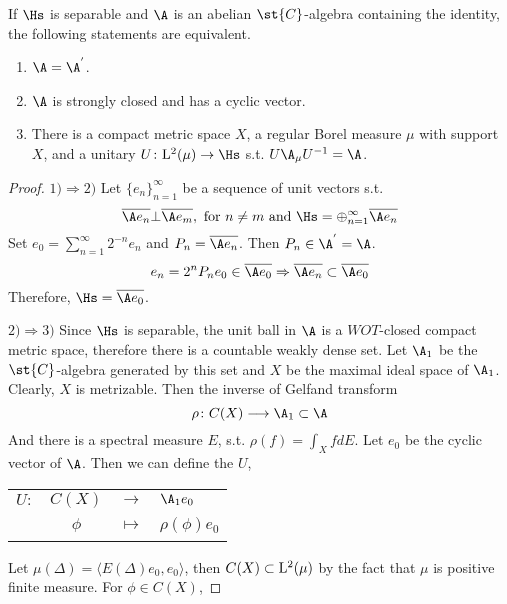 \begin{thm}
	If $\Hs$ is separable and $\A$ is an abelian $\st{C}$-algebra containing the identity, the following statements are equivalent.
	\begin{enumerate}[label=\arabic*)]
		\item $\A=\A^{'}$.
		\item $\A$ is strongly closed and has a cyclic vector.
		\item There is a compact metric space $X$, a regular Borel measure $\mu$ with support $X$, and a unitary $U \colon \lfs{2}(\mu) \sto \Hs$ s.t. $U\A_{\mu}U^{-1}=\A$.
	\end{enumerate}
\end{thm}
\begin{proof}
	$1) \Rightarrow 2)$ Let $\{e_n\}_{n=1}^{\infty}$ be a sequence of unit vectors s.t. 
	\begin{equation*}
		\clo{\A e_n} \bot \clo{\A e_m},\text{ for } n \neq m \text{ and } \Hs = \oplus_{n=1}^{\infty} \clo{\A e_n}
	\end{equation*}
	Set $e_0 = \sum_{n=1}^{\infty} 2^{-n} e_n$ and $P_n = \clo{\A e_n}$. Then $P_n \in \A^{'} = \A$. 
	\begin{equation*}
		e_n = 2^{n} P_n e_0 \in \clo{\A e_0} \Rightarrow \clo{\A e_n} \subset \clo{\A e_0}
	\end{equation*}
	Therefore, $\Hs = \clo{\A e_0}$.
	\item $2) \Rightarrow 3)$ Since $\Hs$ is separable, the unit ball in $\A$ is a $WOT$-closed  compact metric space, therefore there is a countable weakly dense set. Let $\A_1$ be the $\st{C}$-algebra generated by this set and $X$ be the maximal ideal space of $\A_1$. Clearly, $X$ is metrizable. Then the inverse of Gelfand transform
	\begin{equation*}
		\rho \colon C(X) \longrightarrow \A_1 \subset \A
	\end{equation*}
	And there is a spectral measure $E$, s.t. $\rho(f) = \int_{X} f dE$.
	Let $e_0$ be the cyclic vector of $\A$. Then we can define the $U$,
	\begin{center}
		\begin{tabular}{l c c l}
			$U \colon$ & $C(X)$ & $\longrightarrow$ & $\A_1 e_0$ \\
			~ & $\phi$ & $\longmapsto$ & $\rho(\phi)e_0$
		\end{tabular}
	\end{center}
	Let $\mu(\Delta) = \langle E(\Delta)e_0,e_0 \rangle$, then $C(X) \subset \mathrm{L^{2}}(\mu)$ by the fact that $\mu$ is positive finite measure. For $\phi \in C(X)$,

\end{proof}
